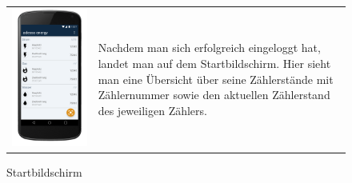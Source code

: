 \begin{figure}[h]
\begin{tabularx}{\textwidth}{X  X}
	\includegraphics[scale = 0.155]{img/AndroidMockup/Main} \caption{Startbildschirm} & Nachdem man sich erfolgreich eingeloggt hat, landet man auf dem Startbildschirm. Hier sieht man eine Übersicht über seine Zählerstände mit Zählernummer sowie den aktuellen Zählerstand des jeweiligen Zählers. \\
\end{tabularx}
\end{figure}


